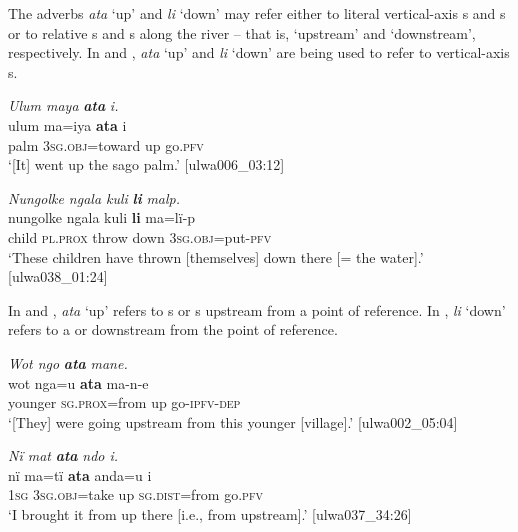 The adverbs \textit{ata} ‘up’ and \textit{li} ‘down’ may refer either to literal vertical-axis s and s or to relative s and s along the river -- that is, ‘upstream’ and ‘downstream’, respectively. In  and , \textit{ata} ‘up’ and \textit{li} ‘down’ are being used to refer to vertical-axis s.

\ea%
    \label{ex:otherwc:73}
          \textit{Ulum maya} \textbf{\textit{ata}} \textit{i.}\\
\gll    ulum  ma=iya      \textbf{ata}  i\\
    palm  3\textsc{sg.obj}=toward  up  go.\textsc{pfv}\\
\glt `[It] went up the sago palm.’ [ulwa006\_03:12]
\z

\ea%
    \label{ex:otherwc:74}
          \textit{Nungolke ngala kuli} \textbf{\textit{li}} \textit{malp.}\\
\gll    nungolke  ngala    kuli  \textbf{li}    ma=lï{}-p\\
    child    \textsc{pl.prox}  throw  down  3\textsc{sg.obj}=put-\textsc{pfv}\\
\glt `These children have thrown [themselves] down there [= the water].’ [ulwa038\_01:24]
\z

In  and , \textit{ata} ‘up’ refers to s or s upstream from a point of reference. In , \textit{li} ‘down’ refers to a  or  downstream from the point of reference.

\ea%
    \label{ex:otherwc:75}
          \textit{Wot ngo} \textbf{\textit{ata}} \textit{mane.}\\
\gll    wot    nga=u        \textbf{ata}  ma-n-e\\
    younger  \textsc{sg.prox}=from  up  go-\textsc{ipfv-dep}\\
\glt `[They] were going upstream from this younger [village].’ [ulwa002\_05:04]
\z

\ea%
    \label{ex:otherwc:76}
          \textit{Nï mat} \textbf{\textit{ata}} \textit{ndo i.}\\
\gll    nï    ma=tï      \textbf{ata}  anda=u    i\\
    1\textsc{sg}  3\textsc{sg.obj}=take  up  \textsc{sg.dist=}from  go.\textsc{pfv}\\
\glt `I brought it from up there [i.e., from upstream].’ [ulwa037\_34:26]
\z

